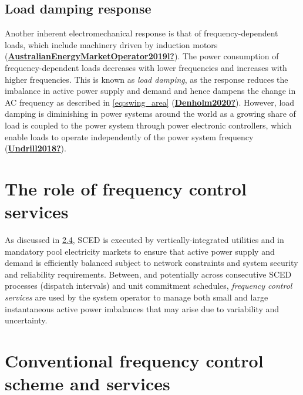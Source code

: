 \documentclass[12pt,a4paper,]{report}
\begin{document}
\hypertarget{sec:load_damp}{%
\subsection{Load damping response}\label{sec:load_damp}}

Another inherent electromechanical response is that of
frequency-dependent loads, which include machinery driven by induction
motors
(\protect\hyperlink{ref-AustralianEnergyMarketOperator2019l}{\textbf{AustralianEnergyMarketOperator2019l?}}).
The power consumption of frequency-dependent loads decreases with lower
frequencies and increases with higher frequencies. This is known as
\emph{load damping}, as the response reduces the imbalance in active
power supply and demand and hence dampens the change in AC frequency as
described in \protect\hyperlink{eq:swing_area}{{[}eq:swing\_area{]}}
(\protect\hyperlink{ref-Denholm2020}{\textbf{Denholm2020?}}). However,
load damping is diminishing in power systems around the world as a
growing share of load is coupled to the power system through power
electronic controllers, which enable loads to operate independently of
the power system frequency
(\protect\hyperlink{ref-Undrill2018}{\textbf{Undrill2018?}}).

\hypertarget{the-role-of-frequency-control-services}{%
\section{The role of frequency control
services}\label{the-role-of-frequency-control-services}}

As discussed in \protect\hyperlink{sec:scuc_sced}{2.4}, SCED is executed
by vertically-integrated utilities and in mandatory pool electricity
markets to ensure that active power supply and demand is efficiently
balanced subject to network constraints and system security and
reliability requirements. Between, and potentially across consecutive
SCED processes (dispatch intervals) and unit commitment schedules,
\emph{frequency control services} are used by the system operator to
manage both small and large instantaneous active power imbalances that
may arise due to variability and uncertainty.

\hypertarget{sec:conventional_freq_control}{%
\section{Conventional frequency control scheme and
services}\label{sec:conventional_freq_control}}
\end{document}
